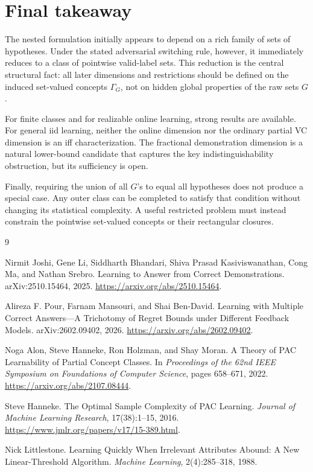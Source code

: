 \documentclass[11pt]{article}
\theoremstyle{definition}
\theoremstyle{remark}
\newcommand{\1}{\mathbf 1}
\begin{document}
\section{Final takeaway}

The nested formulation initially appears to depend on a rich family of sets of hypotheses. Under the stated adversarial switching rule, however, it immediately reduces to a class of pointwise valid-label sets. This reduction is the central structural fact: all later dimensions and restrictions should be defined on the induced set-valued concepts $\Gamma_G$, not on hidden global properties of the raw sets $G$.

For finite classes and for realizable online learning, strong results are available. For general iid learning, neither the online dimension nor the ordinary partial VC dimension is an iff characterization. The fractional demonstration dimension is a natural lower-bound candidate that captures the key indistinguishability obstruction, but its sufficiency is open.

Finally, requiring the union of all $G$'s to equal all hypotheses does not produce a special case. Any outer class can be completed to satisfy that condition without changing its statistical complexity. A useful restricted problem must instead constrain the pointwise set-valued concepts or their rectangular closures.

\begin{thebibliography}{9}

Nirmit Joshi, Gene Li, Siddharth Bhandari, Shiva Prasad Kasiviswanathan, Cong Ma, and Nathan Srebro.
\newblock Learning to Answer from Correct Demonstrations.
\newblock arXiv:2510.15464, 2025.
\newblock \url{https://arxiv.org/abs/2510.15464}.

Alireza F. Pour, Farnam Mansouri, and Shai Ben-David.
\newblock Learning with Multiple Correct Answers---A Trichotomy of Regret Bounds under Different Feedback Models.
\newblock arXiv:2602.09402, 2026.
\newblock \url{https://arxiv.org/abs/2602.09402}.

Noga Alon, Steve Hanneke, Ron Holzman, and Shay Moran.
\newblock A Theory of PAC Learnability of Partial Concept Classes.
\newblock In \emph{Proceedings of the 62nd IEEE Symposium on Foundations of Computer Science}, pages 658--671, 2022.
\newblock \url{https://arxiv.org/abs/2107.08444}.

Steve Hanneke.
\newblock The Optimal Sample Complexity of PAC Learning.
\newblock \emph{Journal of Machine Learning Research}, 17(38):1--15, 2016.
\newblock \url{https://www.jmlr.org/papers/v17/15-389.html}.

Nick Littlestone.
\newblock Learning Quickly When Irrelevant Attributes Abound: A New Linear-Threshold Algorithm.
\newblock \emph{Machine Learning}, 2(4):285--318, 1988.

\end{thebibliography}
\end{document}
